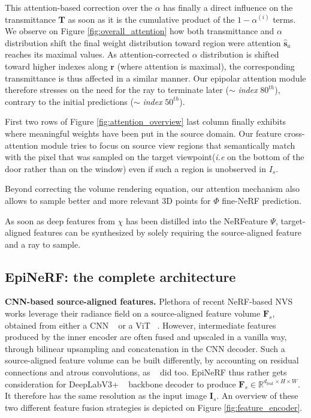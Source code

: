 This attention-based correction over the $\alpha$ has finally a direct influence on the transmittance \textbf{T} as soon as it is the cumulative product of the $1-\alpha^{(i)}$ terms. We observe on Figure \ref{fig:overall_attention} how both transmittance and $\alpha$ distribution shift the final weight distribution toward region were attention $\hat{\textbf{s}}_{a}$  reaches its maximal values. As attention-corrected $\alpha$ distribution is shifted toward higher indexes along $\mathbf{r}$ (where attention is maximal), the corresponding transmittance is thus affected in a similar manner. Our epipolar attention module therefore stresses on the need for the ray to terminate later ($\sim$ \textit{index} $80^{th}$), contrary to the initial predictions ($\sim$ \textit{index} $50^{th}$). \newline 

First two rows of Figure \ref{fig:attention_overview} last column finally exhibits where meaningful weights have been put in the source domain. Our feature cross-attention module tries to focus on source view regions that semantically match with the pixel that was sampled on the target viewpoint(\textit{i.e} on the bottom of the door rather than on the window) even if such a region is unobserved in $I_s$.

Beyond correcting the volume rendering equation, our attention mechanism also allows to sample better and more relevant 3D points for $\Phi$ fine-NeRF prediction.

As soon as deep features from $\chi$ has been distilled into the NeRFeature $\Psi$, target-aligned features can be synthesized by solely requiring the source-aligned feature and a ray to sample.



\subsection{EpiNeRF: the complete architecture}
\label{subsec:epinerf}
\noindent\textbf{CNN-based source-aligned features.} Plethora of recent NeRF-based NVS works leverage their radiance field on a source-aligned feature volume $\mathbf{F}_{s}$, obtained from either a CNN ~\citep{jang2021codenerf,yu2021pixelnerf,li2022symmnerf} or a ViT ~\citep{lin2023vision}. However, intermediate features produced by the inner encoder are often fused and upscaled in a vanilla way, through bilinear upsampling and concatenation in the CNN decoder. 
Such a source-aligned feature volume can be built differently, by accounting on residual connections and atrous convolutions, as ~\citep{chan2023genvs} did too. 
EpiNeRF thus rather gets consideration for DeepLabV3+ ~\citep{chen2018encoder} backbone decoder to produce $\textbf{F}_{s}\in \mathbb{R}^{d_{\text{feat}} \times H \times W}$. It therefore has the same resolution as the input image $\mathbf{I}_s$. An overview of these two different feature fusion strategies is depicted on Figure \ref{fig:feature_encoder}. 

